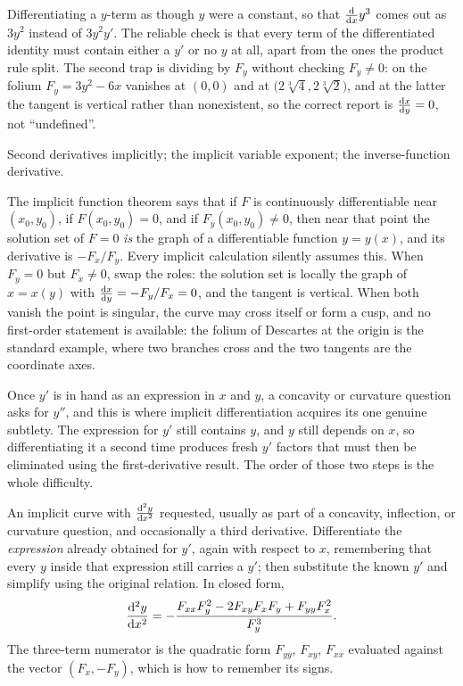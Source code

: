 \begin{trap}
Differentiating a $y$-term as though $y$ were a constant, so that $\frac{\mathrm{d}}{\mathrm{d}x}y^{3}$ comes out as $3y^{2}$ instead of $3y^{2}y'$. The reliable check is that every term of the differentiated identity must contain either a $y'$ or no $y$ at all, apart from the ones the product rule split. The second trap is dividing by $F_{y}$ without checking $F_{y}\neq0$: on the folium $F_{y}=3y^{2}-6x$ vanishes at $(0,0)$ and at $\bigl(2\sqrt[3]{4},2\sqrt[3]{2}\bigr)$, and at the latter the tangent is vertical rather than nonexistent, so the correct report is $\frac{\mathrm{d}x}{\mathrm{d}y}=0$, not ``undefined''.
\end{trap}

\begin{seealsob}Second derivatives implicitly; the implicit variable exponent; the inverse-function derivative.\end{seealsob}

\begin{keynote}
The implicit function theorem says that if $F$ is continuously differentiable near $(x_{0},y_{0})$, if $F(x_{0},y_{0})=0$, and if $F_{y}(x_{0},y_{0})\neq0$, then near that point the solution set of $F=0$ \emph{is} the graph of a differentiable function $y=y(x)$, and its derivative is $-F_{x}/F_{y}$. Every implicit calculation silently assumes this. When $F_{y}=0$ but $F_{x}\neq0$, swap the roles: the solution set is locally the graph of $x=x(y)$ with $\frac{\mathrm{d}x}{\mathrm{d}y}=-F_{y}/F_{x}=0$, and the tangent is vertical. When both vanish the point is singular, the curve may cross itself or form a cusp, and no first-order statement is available: the folium of Descartes at the origin is the standard example, where two branches cross and the two tangents are the coordinate axes.
\end{keynote}

Once $y'$ is in hand as an expression in $x$ and $y$, a concavity or curvature question asks for $y''$, and this is where implicit differentiation acquires its one genuine subtlety. The expression for $y'$ still contains $y$, and $y$ still depends on $x$, so differentiating it a second time produces fresh $y'$ factors that must then be eliminated using the first-derivative result. The order of those two steps is the whole difficulty.

\cue An implicit curve with $\frac{\mathrm{d}^{2}y}{\mathrm{d}x^{2}}$ requested, usually as part of a concavity, inflection, or curvature question, and occasionally a third derivative.
\method Differentiate the \emph{expression} already obtained for $y'$, again with respect to $x$, remembering that every $y$ inside that expression still carries a $y'$; then substitute the known $y'$ and simplify using the original relation. In closed form,
\[
\frac{\mathrm{d}^{2}y}{\mathrm{d}x^{2}}=-\frac{F_{xx}F_{y}^{2}-2F_{xy}F_{x}F_{y}+F_{yy}F_{x}^{2}}{F_{y}^{3}} .
\]
The three-term numerator is the quadratic form $F_{yy}$, $F_{xy}$, $F_{xx}$ evaluated against the vector $(F_{x},-F_{y})$, which is how to remember its signs.

